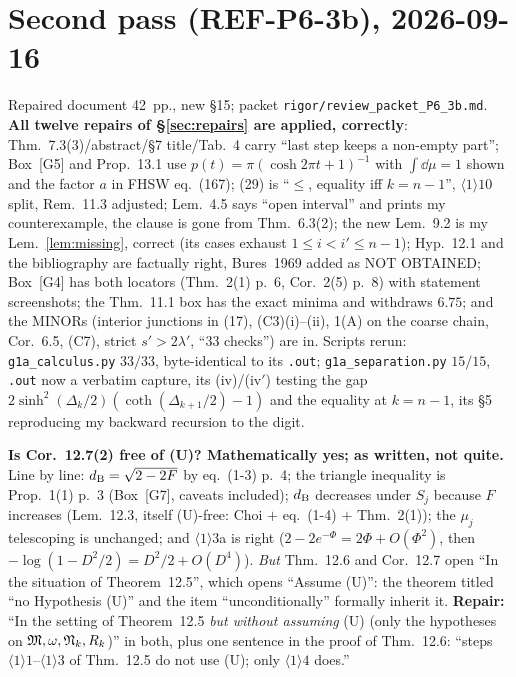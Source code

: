 \documentclass[11pt]{article}
\theoremstyle{definition}\newtheorem{example}[theorem]{Example}
\begin{document}
\section{Second pass (REF-P6-3b), 2026-09-16}\label{sec:pass2}
Repaired document 42~pp., new \S15; packet \texttt{rigor/review\_packet\_P6\_3b.md}.  \textbf{All
twelve repairs of \S\ref{sec:repairs} are applied, correctly}: Thm.~7.3(3)/abstract/\S7
title/Tab.~4 carry ``last step keeps a non-empty part''; Box~[G5] and Prop.~13.1 use
$p(t)=\pi(\cosh2\pi t+1)^{-1}$ with $\int\dd\mu=1$ shown and the factor $a$ in FHSW eq.~(167);
(29) is ``$\le$, equality iff $k=n-1$'', $\langle1\rangle10$ split, Rem.~11.3 adjusted; Lem.~4.5
says ``open interval'' and prints my counterexample, the clause is gone from Thm.~6.3(2); the new
Lem.~9.2 is my Lem.~\ref{lem:missing}, correct (its cases exhaust $1\le i<i'\le n-1$); Hyp.~12.1
and the bibliography are factually right, Bures~1969 added as NOT OBTAINED; Box~[G4] has both
locators (Thm.~2(1) p.~6, Cor.~2(5) p.~8) with statement screenshots; the Thm.~11.1 box has the
exact minima and withdraws $6.75$; and the MINORs (interior junctions in (17), (C3)(i)--(ii),
1(A) on the coarse chain, Cor.~6.5, (C7), strict $s'>2\lambda'$, ``$33$ checks'') are in.
Scripts rerun: \texttt{g1a\_calculus.py} $33/33$, byte-identical to its \texttt{.out};
\texttt{g1a\_separation.py} $15/15$, \texttt{.out} now a verbatim capture, its (iv)/(iv$'$)
testing the gap $2\sinh^2(\Delta_k/2)(\coth(\Delta_{k+1}/2)-1)$ and the equality at $k=n-1$, its
\S5 reproducing my backward recursion to the digit.

\textbf{Is Cor.~12.7(2) free of (U)?  Mathematically yes; as written, not quite.}  Line by line:
$d_{\rm B}=\sqrt{2-2F}$ by \cite{AU02} eq.~(1-3) p.~4; the triangle inequality is Prop.~1(1) p.~3
(Box~[G7], caveats included); $d_{\rm B}$ decreases under $S_j$ because $F$ increases (Lem.~12.3,
itself (U)-free: Choi $+$ eq.~(1-4) $+$ Thm.~2(1)); the $\mu_j$ telescoping is unchanged; and
$\langle1\rangle3$a is right ($2-2e^{-\Phi}=2\Phi+O(\Phi^2)$, then $-\log(1-D^2/2)=D^2/2+O(D^4)$).
\emph{But} Thm.~12.6 and Cor.~12.7 open ``In the situation of Theorem~12.5'', which opens
``Assume (U)'': the theorem titled ``no Hypothesis (U)'' and the item ``unconditionally''
formally inherit it.  \textbf{Repair:} ``In the setting of Theorem~12.5 \emph{but without
assuming} (U) (only the hypotheses on $\mathfrak M,\omega,\mathfrak N_k,R_k$)'' in both, plus one sentence in the
proof of Thm.~12.6: ``steps $\langle1\rangle1$--$\langle1\rangle3$ of Thm.~12.5 do not use (U);
only $\langle1\rangle4$ does.''
\end{document}
